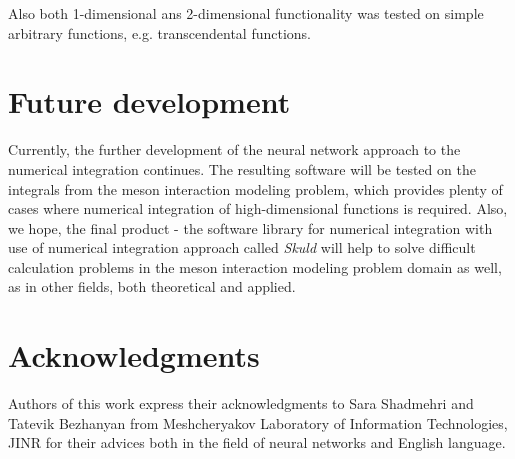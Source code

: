 \documentclass[%
]{ittmm}
\begin{document}
Also both 1-dimensional ans 2-dimensional functionality was tested on simple arbitrary functions, e.g. transcendental functions.

\section{Future development}

Currently, the further development of the neural network approach to the numerical integration continues. The resulting software will be tested on the integrals from the meson interaction modeling problem, which provides plenty of cases where numerical integration of high-dimensional functions is required. Also, we hope, the final product - the software library for numerical integration with use of numerical integration approach called \textit{Skuld} will help to solve difficult calculation problems in the meson interaction modeling problem domain as well, as in other fields, both theoretical and applied.

\section{Acknowledgments}

Authors of this work express their acknowledgments to Sara Shadmehri and Tatevik Bezhanyan from Meshcheryakov Laboratory of Information Technologies, JINR for their advices both in the field of neural networks and English language.


\end{document}
